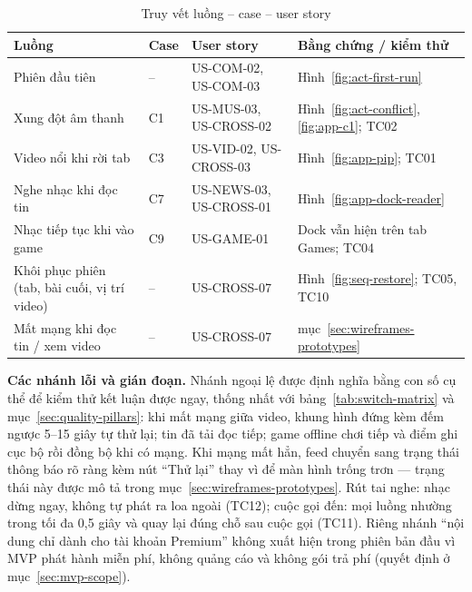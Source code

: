 \begin{table}[H]
\centering
\caption{Truy vết luồng -- case -- user story}
\label{tab:flow-trace}
\begin{tabularx}{\textwidth}{>{\raggedright\arraybackslash}p{2.7cm} >{\raggedright\arraybackslash}p{1.4cm} >{\raggedright\arraybackslash}p{4.3cm} >{\raggedright\arraybackslash}X}
\toprule
\textbf{Luồng} & \textbf{Case} & \textbf{User story} & \textbf{Bằng chứng / kiểm thử} \\
\midrule
Phiên đầu tiên & -- & US-COM-02, US-COM-03 & Hình~\ref{fig:act-first-run} \\
Xung đột âm thanh & C1 & US-MUS-03, US-CROSS-02 & Hình~\ref{fig:act-conflict}, \ref{fig:app-c1}; TC02 \\
Video nổi khi rời tab & C3 & US-VID-02, US-CROSS-03 & Hình~\ref{fig:app-pip}; TC01 \\
Nghe nhạc khi đọc tin & C7 & US-NEWS-03, US-CROSS-01 & Hình~\ref{fig:app-dock-reader} \\
Nhạc tiếp tục khi vào game & C9 & US-GAME-01 & Dock vẫn hiện trên tab Games; TC04 \\
Khôi phục phiên (tab, bài cuối, vị trí video) & -- & US-CROSS-07 & Hình~\ref{fig:seq-restore}; TC05, TC10 \\
Mất mạng khi đọc tin / xem video & -- & US-CROSS-07 & mục~\ref{sec:wireframes-prototypes} \\
\bottomrule
\end{tabularx}
\end{table}

\textbf{Các nhánh lỗi và gián đoạn.} Nhánh ngoại lệ được định nghĩa bằng con số cụ thể để kiểm thử kết luận được ngay, thống nhất với bảng~\ref{tab:switch-matrix} và mục~\ref{sec:quality-pillars}: khi mất mạng giữa video, khung hình đứng kèm đếm ngược 5--15 giây tự thử lại; tin đã tải đọc tiếp; game offline chơi tiếp và điểm ghi cục bộ rồi đồng bộ khi có mạng. Khi mạng mất hẳn, feed chuyển sang trạng thái thông báo rõ ràng kèm nút ``Thử lại'' thay vì để màn hình trống trơn — trạng thái này được mô tả trong mục~\ref{sec:wireframes-prototypes}. Rút tai nghe: nhạc dừng ngay, không tự phát ra loa ngoài (TC12); cuộc gọi đến: mọi luồng nhường trong tối đa 0,5 giây và quay lại đúng chỗ sau cuộc gọi (TC11). Riêng nhánh ``nội dung chỉ dành cho tài khoản Premium'' không xuất hiện trong phiên bản đầu vì MVP phát hành miễn phí, không quảng cáo và không gói trả phí (quyết định ở mục~\ref{sec:mvp-scope}).
